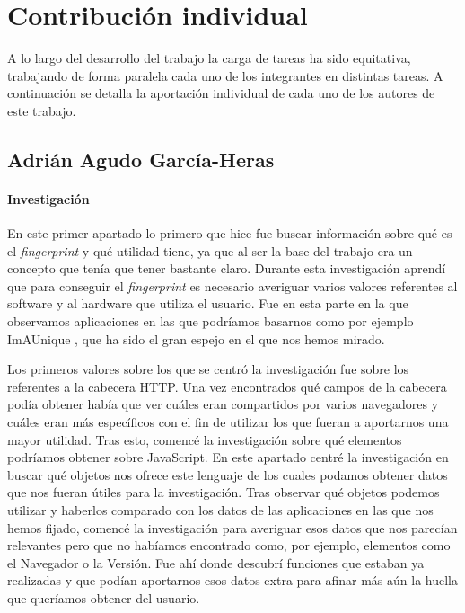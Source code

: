 \chapter{Contribución individual}
A lo largo del desarrollo del trabajo la carga de tareas ha sido equitativa, trabajando de forma paralela cada uno de los integrantes en distintas tareas. A continuación se detalla la aportación individual de cada uno de los autores de este trabajo.
\section{Adrián Agudo García-Heras}
\subsubsection{Investigación}
En este primer apartado lo primero que hice fue buscar información sobre qué es el \textit{fingerprint} y qué utilidad tiene, ya que al ser la base del trabajo era un concepto que tenía que tener bastante claro. Durante esta investigación aprendí que para conseguir el \textit{fingerprint} es necesario averiguar varios valores referentes al software y al hardware que utiliza el usuario. Fue en esta parte en la que observamos aplicaciones en las que podríamos basarnos como por ejemplo ImAUnique \cite{amiunique}, que ha sido el gran espejo en el que nos hemos mirado. \par
Los primeros valores sobre los que se centró la investigación fue sobre los referentes a la cabecera HTTP. Una vez encontrados qué campos de la cabecera podía obtener había que ver cuáles eran compartidos por varios navegadores y cuáles eran más específicos con el fin de utilizar los que fueran a aportarnos una mayor utilidad.
Tras esto, comencé la investigación sobre qué elementos podríamos obtener sobre JavaScript. En este apartado centré la investigación en buscar qué objetos nos ofrece este lenguaje de los cuales podamos obtener datos que nos fueran útiles para la investigación. Tras observar qué objetos podemos utilizar y haberlos comparado con los datos de las aplicaciones en las que nos hemos fijado, comencé la investigación para averiguar esos datos que nos parecían relevantes pero que no habíamos encontrado como, por ejemplo, elementos como el Navegador o la Versión. Fue ahí donde descubrí funciones que estaban ya realizadas y que podían aportarnos esos datos extra para afinar más aún la huella que queríamos obtener del usuario.

